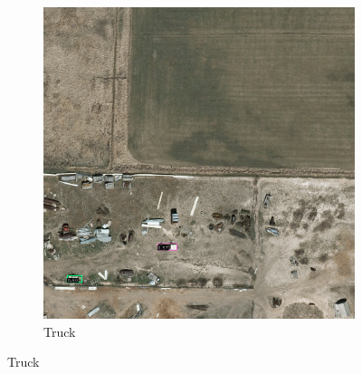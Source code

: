 \begin{figure}[h!]
\begin{subfigure}[t]{0.38\textwidth}
        \includegraphics[width=\linewidth]{images/015Results/01abb_vs_obb/comp_images/aab_old/212.png}
        \caption{Truck}
    \end{subfigure}
    

\end{figure}
